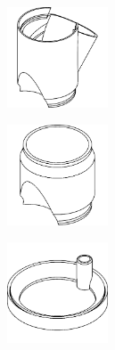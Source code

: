 \begin{center}
    \begin{minipage}{0.3\textwidth}
        \centering
        \includegraphics[height=3cm]{images/wireframes/80mm_module.png}
    \end{minipage}
    \hfill
    \begin{minipage}{0.3\textwidth}
        \centering
        \includegraphics[height=3cm]{images/wireframes/80mm_chimney.png}
    \end{minipage}
    \hfill
    \begin{minipage}{0.3\textwidth}
        \centering
        \includegraphics[height=3cm]{images/wireframes/80mm_shower_head.png}
    \end{minipage}



\end{center}
